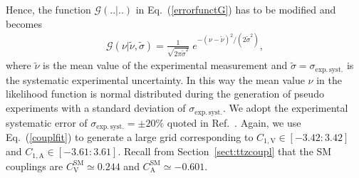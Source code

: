\documentclass{JHEP3}
\newcommand{\mrm}{\mathrm}
\def\ConeA{C_{1,\mathrm{A}}}
\def\ConeV{C_{1,\mathrm{V}}}
\def\ConeVSM{C_\mathrm{V}^{\mrm{SM}}}
\def\ConeASM{C_\mathrm{A}^{\mrm{SM}}}
\newcommand{\be}{\begin{eqnarray}}
\newcommand{\ee}{\end{eqnarray}}
\begin{document}
Hence, the function $\mathcal{G}(..|..)$ in Eq.~(\ref{errorfunctG}) has to be modified and becomes
\be
  \label{Gaussuncert}
  \mathcal{G} \left( \nu | \tilde{\nu},\tilde{\sigma} \right) = \frac{1}{\sqrt{2\pi\tilde{\sigma}^2}} \; e^{-(\nu-\tilde{\nu})^2 / (2\tilde{\sigma}^2)}, 
\ee
where $\tilde{\nu}$ is the mean value of the experimental measurement and $\tilde{\sigma}=\sigma_\mathrm{exp.\,syst.}$ is the systematic experimental uncertainty. 
In this way the mean value $\nu$ in the likelihood function is normal distributed during the generation of pseudo experiments with 
a standard deviation of $\sigma_\mathrm{exp.\,syst.}$. 
We adopt the experimental systematic error of $\sigma_\mathrm{exp.\,syst.}=\pm 20\%$ quoted in Ref.~\cite{Chatrchyan:2013qca}. 
Again, we use Eq.~(\ref{couplfit}) to generate a large grid corresponding to $\ConeV \in [-3.42:3.42]$ and $\ConeA \in [-3.61:3.61]$. 
Recall from Section~\ref{sect:ttzcoupl} that the SM couplings are $\ConeVSM \simeq 0.244$ and $\ConeASM \simeq -0.601$.
%
\end{document}
